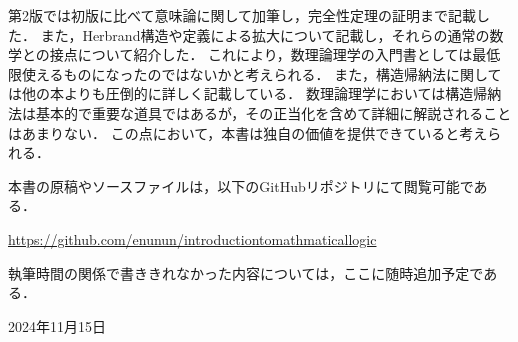 第2版では初版に比べて意味論に関して加筆し，完全性定理の証明まで記載した．
また，Herbrand構造や定義による拡大について記載し，それらの通常の数学との接点について紹介した．
これにより，数理論理学の入門書としては最低限使えるものになったのではないかと考えられる．
また，構造帰納法に関しては他の本よりも圧倒的に詳しく記載している．
数理論理学においては構造帰納法は基本的で重要な道具ではあるが，その正当化を含めて詳細に解説されることはあまりない．
この点において，本書は独自の価値を提供できていると考えられる．

本書の原稿やソースファイルは，以下のGitHubリポジトリにて閲覧可能である．

\begin{center}
	\url{https://github.com/enunun/introductiontomathmaticallogic}
\end{center}

執筆時間の関係で書ききれなかった内容については，ここに随時追加予定である．

\begin{flushright}
	2024年11月15日
\end{flushright}